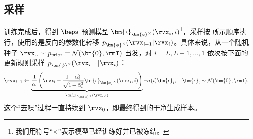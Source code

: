 

\subsection{采样}
训练完成后，得到 $\beps$ 预测模型 $\bm{\epsilon}_{\bm{\phi}^\times}(\rvx_i, i)$\footnote{我们用符号``$\times$''表示模型已经训练好并已被冻结。}，采样按  所示顺序执行，使用的是反向的参数化转移 $p_{\bm{\phi}^\times}(\rvx_{i-1} | \rvx_i)$。具体来说，从一个随机种子 $\rvx_L \sim p_{\text{prior}} = \mathcal{N}(\bm{0},\rmI)$ 出发，对 $i = L, L-1, \dots, 1$ 依次按下面的更新规则采样 $p_{\bm{\phi}^\times}(\rvx_{i-1} | \rvx_i)$：
\begin{align}\label{eq:ddpm-sampling}
    \rvx_{i-1} \leftarrow \underbrace{\frac{1}{\alpha_i}\left( \rvx_i  - \frac{1-\alpha_i^2}{\sqrt{1-\bar{\alpha}_i^2}} \bm{\epsilon}_{\bm{\phi}^\times}(\rvx_i, i)\right)}_{\bm{\mu}_{\bm{\phi}^\times}(\rvx_i, i)} +\sigma(i) \bm{\epsilon}_i,\quad \bm{\epsilon}_i\sim  \mathcal{N}(\bm{0},\rmI).
\end{align}
这个``去噪''过程一直持续到 $\rvx_0$，即最终得到的干净生成样本。

